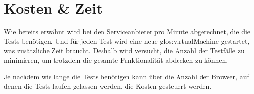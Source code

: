 \section{Kosten \& Zeit}
Wie bereits erwähnt wird bei den Serviceanbieter pro Minute abgerechnet, die die Tests benötigen. Und für jeden Test wird eine neue \Gls{glos:virtualMachine} gestartet, was zusätzliche Zeit braucht. Deshalb wird versucht, die Anzahl der Testfälle zu minimieren, um trotzdem die gesamte Funktionalität abdecken zu können.

Je nachdem wie lange die Tests benötigen kann über die Anzahl der Browser, auf denen die Tests laufen gelassen werden, die Kosten gesteuert werden.